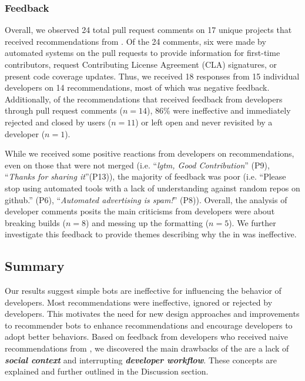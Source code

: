 \subsubsection{Feedback}

Overall, we observed 24 total pull request comments on 17 unique projects that received recommendations from \toolone. Of the 24 comments, six were made by automated systems on the pull requests to provide information for first-time contributors, request Contributing License Agreement (CLA) signatures, or present code coverage updates. Thus, we received 18 responses from 15 individual developers on 14 recommendations, most of which was negative feedback. Additionally, of the recommendations that received feedback from developers through pull request comments ($n = 14$), 86\% were ineffective and immediately rejected and closed by users ($n = 11$) or left open and never revisited by a developer ($n = 1$). 

While we received some positive reactions from developers on \toolone recommendations, even on those that were not merged (i.e. ``\textit{lgtm, Good Contribution}'' (P9), ``\textit{Thanks for sharing it}''(P13)), the majority of feedback was poor (i.e. ``Please stop using automated tools with a lack of understanding against random repos on github.'' (P6), ``\textit{Automated advertising is spam!}'' (P8)). Overall, the analysis of developer comments posits the main criticisms from developers were about breaking builds ($n = 8$) and messing up the \pom formatting ($n = 5$). We further investigate this feedback to provide themes describing why the \tele in \toolone was ineffective.

\subsection{Summary}

Our results suggest simple bots are ineffective for influencing the behavior of developers. Most \tele recommendations were ineffective, ignored or rejected by developers. This motivates the need for new design approaches and improvements to recommender bots to enhance recommendations and encourage developers to adopt better behaviors. Based on feedback from developers who received naive recommendations from \toolone, we discovered the main drawbacks of the \tele are a lack of \textit{\textbf{social context}} and interrupting \textit{\textbf{developer workflow}}. These concepts are explained and further outlined in the Discussion section.


